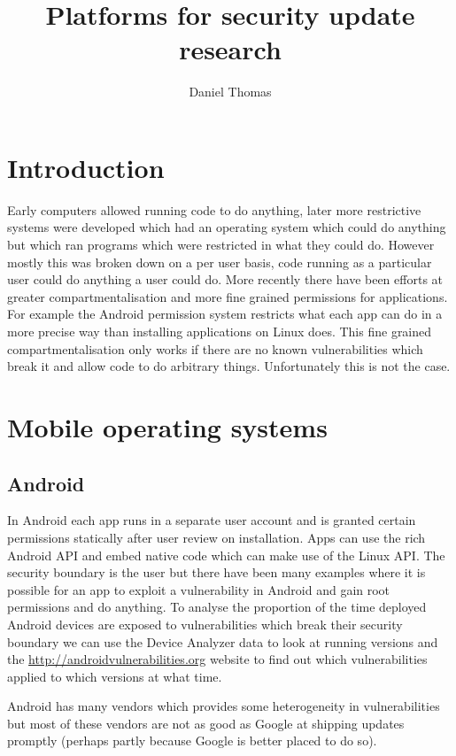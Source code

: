 \documentclass[12pt,a4paper]{article}
\author{Daniel Thomas}
\title{Platforms for security update research}
\begin{document}
\maketitle

\section{Introduction}
Early computers allowed running code to do anything, later more restrictive systems were developed which had an operating system which could do anything but which ran programs which were restricted in what they could do.
However mostly this was broken down on a per user basis, code running as a particular user could do anything a user could do.
More recently there have been efforts at greater compartmentalisation and more fine grained permissions for applications.
For example the Android permission system restricts what each app can do in a more precise way than installing applications on Linux does.
This fine grained compartmentalisation only works if there are no known vulnerabilities which break it and allow code to do arbitrary things.
Unfortunately this is not the case.

\section{Mobile operating systems}


\subsection{Android}
In Android each app runs in a separate user account and is granted certain permissions statically after user review on installation.
Apps can use the rich Android API and embed native code which can make use of the Linux API.
The security boundary is the user but there have been many examples where it is possible for an app to exploit a vulnerability in Android and gain root permissions and do anything.
To analyse the proportion of the time deployed Android devices are exposed to vulnerabilities which break their security boundary we can use the Device Analyzer data to look at running versions and the \url{http://androidvulnerabilities.org} website to find out which vulnerabilities applied to which versions at what time.

Android has many vendors which provides some heterogeneity in vulnerabilities but most of these vendors are not as good as Google at shipping updates promptly (perhaps partly because Google is better placed to do so).
\end{document}
